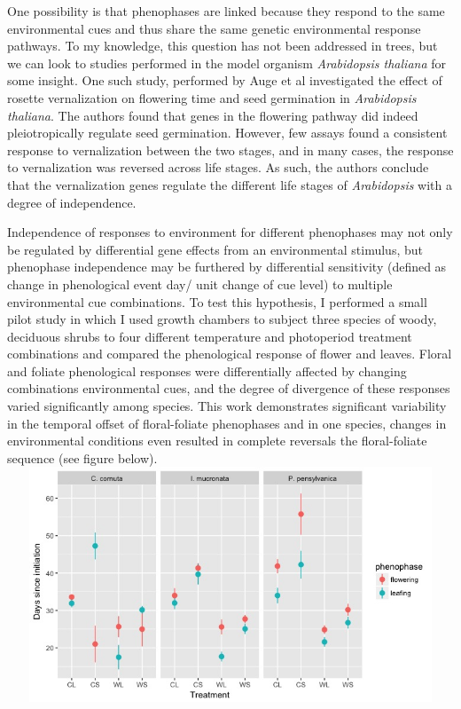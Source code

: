 \documentclass{article}\usepackage[]{graphicx}\usepackage[]{color}
\begin{document}
\par One possibility is that phenophases are linked because they respond to the same environmental cues and thus share the same genetic environmental response pathways. To my knowledge, this question has not been addressed in trees, but we can look to studies performed in the model organism \textit{Arabidopsis thaliana} for some insight. One such study, performed by Auge et al \citeyear{Auge2017} investigated the effect of rosette vernalization on flowering time and seed germination in \textit{Arabidopsis thaliana}. The authors found that genes in the flowering pathway did indeed pleiotropically regulate seed germination. However, few assays found a consistent response to vernalization between the two stages, and in many cases, the response to vernalization was reversed across life stages. As such, the authors conclude that the vernalization genes regulate the different life stages of \textit{Arabidopsis} with a degree of independence.
\par Independence of responses to environment for different phenophases may not only be regulated by differential gene effects from an environmental stimulus, but phenophase independence may be furthered by differential sensitivity (defined as change in phenological event day/ unit change of cue level) to multiple environmental cue combinations. To test this hypothesis, I performed a small pilot study in which I used growth chambers to  subject three species of woody, deciduous shrubs to four different temperature and photoperiod treatment combinations and compared the phenological response of flower and leaves. Floral and foliate phenological responses were differentially affected by changing combinations environmental cues, and  the degree of divergence of these responses varied significantly among species. This work demonstrates significant variability in the temporal offset of floral-foliate phenophases and in one species, changes in environmental conditions even resulted in complete reversals the floral-foliate sequence (see figure below).\\
\includegraphics[width=16cm,height=7cm] {shrubs_4_csee}
\end{document}
